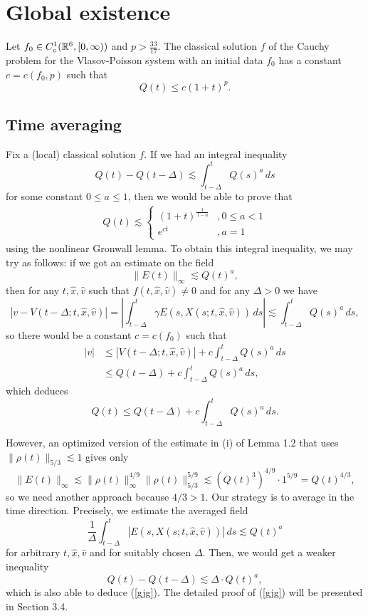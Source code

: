 \documentclass[12pt]{article}
\begin{document}
\section{Global existence}



\begin{thm*}[Schaeffer, 1991]
Let $f_0\in C_c^1(\mathbb{R}^6,[0,\infty))$ and $p>\frac{33}{17}$.
The classical solution $f$ of the Cauchy problem for the Vlasov-Poisson system with an initial data $f_0$ has a constant $c=c(f_0,p)$ such that
\[Q(t)\le c(1+t)^p.\]
\end{thm*}

\subsection{Time averaging}
Fix a (local) classical solution $f$.
If we had an integral inequality
\[Q(t)-Q(t-\Delta)\lesssim\int_{t-\Delta}^tQ(s)^a\,ds\]
for some constant $0\le a\le1$, then we would be able to prove that
\begin{align}\label{gjg}
Q(t)\lesssim\begin{cases}(1+t)^{\frac1{1-a}}&,0\le a<1\\e^{ct}&,a=1\end{cases}
\end{align}
using the nonlinear Gronwall lemma.
To obtain this integral inequality, we may try as follows: if we got an estimate on the field
\[\|E(t)\|_\infty\lesssim Q(t)^a,\]
then for any $t,\hat x,\hat v$ such that $f(t,\hat x,\hat v)\ne0$ and for any $\Delta>0$ we have
\[|v-V(t-\Delta;t,\hat x,\hat v)|=|\int_{t-\Delta}^t\gamma E(s,X(s;t,\hat x,\hat v))\,ds|\lesssim\int_{t-\Delta}^tQ(s)^a\,ds,\]
so there would be a constant $c=c(f_0)$ such that
\begin{align*}
|v|&\le|V(t-\Delta;t,\hat x,\hat v)|+c\int_{t-\Delta}^tQ(s)^a\,ds\\
&\le Q(t-\Delta)+c\int_{t-\Delta}^tQ(s)^a\,ds,
\end{align*}
which deduces
\[Q(t)\le Q(t-\Delta)+c\int_{t-\Delta}^tQ(s)^a\,ds.\]

However, an optimized version of the estimate in (i) of Lemma 1.2 that uses $\|\rho(t)\|_{5/3}\lesssim1$ gives only
\[\|E(t)\|_\infty\lesssim\|\rho(t)\|_\infty^{4/9}\|\rho(t)\|_{5/3}^{5/9}\lesssim(Q(t)^3)^{4/9}\cdot1^{5/9}=Q(t)^{4/3},\]
so we need another approach because $4/3>1$.
Our strategy is to average in the time direction.
Precisely, we estimate the averaged field
\[\frac1\Delta\int_{t-\Delta}^t|E(s,X(s;t,\hat x,\hat v))|\,ds\lesssim Q(t)^a\]
for arbitrary $t,\hat x,\hat v$ and for suitably chosen $\Delta$.
Then, we would get a weaker inequality
\[Q(t)-Q(t-\Delta)\lesssim \Delta\cdot Q(t)^a,\]
which is also able to deduce (\ref{gjg}).
The detailed proof of (\ref{gjg}) will be presented in Section 3.4.
\end{document}
